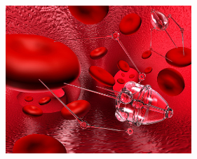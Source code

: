 \documentclass[a4paper, 11pt]{article}
\begin{document}
\begin{figure}[b]
    \centering 
    \includegraphics[width=70mm]{nanobots.jpg}
    \caption{\label{fig1}
    \label{nanobots}}
\end{figure}



\end{document}
